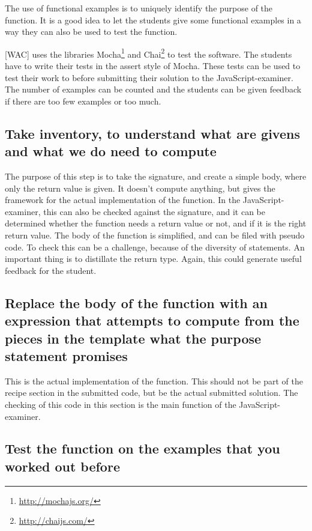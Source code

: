 The use of functional examples is to uniquely identify the purpose of the
function.
It is a good idea to let the students give some functional examples in a way
they can also be used to test the function.

[WAC] uses the libraries Mocha\footnote{\url{http://mochajs.org/}} and
Chai\footnote{\url{http://chaijs.com/}} to test the software.
The students have to write their tests in the assert style of Mocha.
These tests can be used to test their work to before submitting their solution
to the JavaScript-examiner.
The number of examples can be counted and the students can be given feedback if
there are too few examples or too much.


\subsection{Take inventory, to understand what are givens and what we do need to compute}

The purpose of this step is to take the signature, and create a simple body,
where only the return value is given.
It doesn't compute anything, but gives the framework for the actual
implementation of the function.
In the JavaScript-examiner, this can also be checked against the signature, and
it can be determined whether the function needs a return value or not, and if it
is the right return value. The body of the function is simplified, and can be
filed with pseudo code.
To check this can be a challenge, because of the diversity of statements. An
important thing is to distillate the return type.
Again, this could generate useful feedback for the student.


\subsection{Replace the body of the function with an expression that attempts to compute from the pieces in the template what the purpose statement promises}

This is the actual implementation of the function.
This should not be part of the recipe section in the submitted code, but be the
actual submitted solution.
The checking of this code in this section is the main function of the
JavaScript-examiner.


\subsection{Test the function on the examples that you worked out before}

